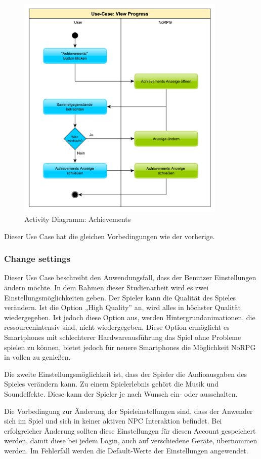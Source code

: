 			\begin{figure}[htbp]
				\centering 
				\label{umlAchievements}
				\includegraphics[width=10cm]{pics/Achievements.pdf}
				\caption{Activity Diagramm: Achievements}
			\end{figure}
			
			Dieser Use Case hat die gleichen Vorbedingungen wie der vorherige.
		
		\subsubsection{Change settings}
			Dieser Use Case beschreibt den Anwendungsfall, dass der Benutzer Einstellungen ändern möchte. In dem Rahmen dieser Studienarbeit wird es zwei Einstellungsmöglichkeiten geben. Der Spieler kann die Qualität des Spieles verändern. Ist die Option „High Quality” an, wird alles in höchster Qualität wiedergegeben. Ist jedoch diese Option aus, werden Hintergrundanimationen, die ressourcenintensiv sind, nicht wiedergegeben. Diese Option ermöglicht es Smartphones mit schlechterer Hardwareausführung das Spiel ohne Probleme spielen zu können, bietet jedoch für neuere Smartphones die Möglichkeit NoRPG in vollen zu genießen.
			
			Die zweite Einstellungsmöglichkeit ist, dass der Spieler die Audioausgaben des Spieles verändern kann. Zu einem Spielerlebnis gehört die Musik und Soundeffekte. Diese kann der Spieler je nach Wunsch ein- oder ausschalten.

			Die Vorbedingung zur Änderung der Spieleinstellungen sind, dass der Anwender sich im Spiel und sich in keiner aktiven \ac{NPC} Interaktion befindet. Bei erfolgreicher Änderung sollten diese Einstellungen für diesen Account gespeichert werden, damit diese bei jedem Login, auch auf verschiedene Geräte, übernommen werden. Im Fehlerfall werden die Default-Werte der Einstellungen angewendet. 
	
